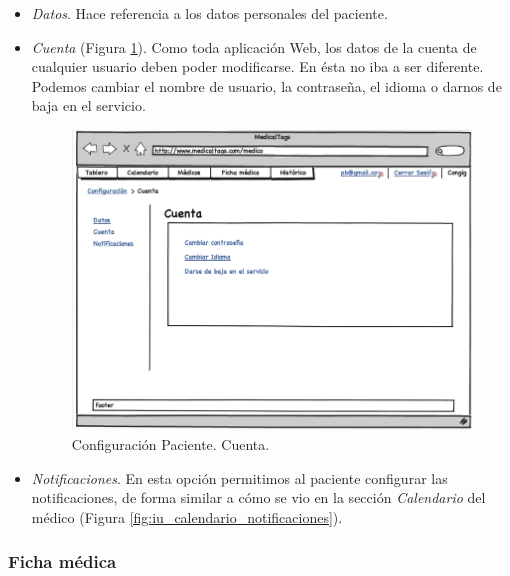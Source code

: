 			\begin{itemize}
				\item \textit{Datos}. Hace referencia a los datos personales del paciente. 
				\item \textit{Cuenta} (Figura \ref{fig:iu_configuracion_cuenta_paciente}). Como toda aplicación Web, los datos de la cuenta de cualquier usuario deben poder modificarse. En ésta no iba a ser diferente. Podemos cambiar el nombre de usuario, la contraseña, el idioma o darnos de baja en el servicio.

				\begin{figure}[H]
				  \centering
				    \includegraphics[width=12cm]{img/png/interfaz/28_1_Cuenta_Pacientes.png}
				  \caption{Configuración Paciente. Cuenta.}
				  \label{fig:iu_configuracion_cuenta_paciente}
				\end{figure}

				\item \textit{Notificaciones}. En esta opción permitimos al paciente configurar las notificaciones, de forma similar a cómo se vio en la sección \textit{Calendario} del médico (Figura \ref{fig:iu_calendario_notificaciones}). 
			\end{itemize}
		
		
	
	
	\subsubsection{Ficha médica} %
		\label{sub:interf_ficha_medica}
	
